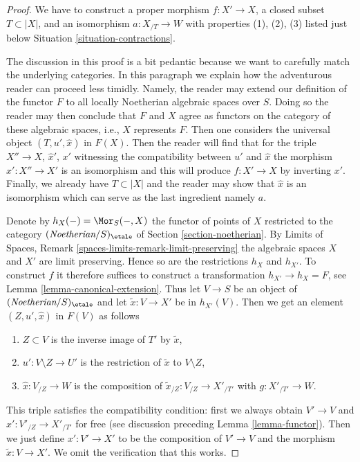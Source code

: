\begin{proof}
We have to construct a proper morphism $f : X' \to X$, a closed subset
$T \subset |X|$, and an isomorphism $a : X_{/T} \to W$ with properties
(1), (2), (3) listed just below Situation \ref{situation-contractions}.

\medskip\noindent
The discussion in this proof is a bit pedantic because we want
to carefully match the underlying categories. In this paragraph
we explain how the adventurous reader can proceed less timidly.
Namely, the reader may extend our definition of the functor $F$
to all locally Noetherian algebraic spaces over $S$.
Doing so the reader may then conclude that $F$ and $X$ agree as
functors on the category of these algebraic spaces, i.e.,
$X$ represents $F$. Then one considers the universal object
$(T, u', \hat x)$ in $F(X)$. Then the reader will find that
for the triple $X'' \to X$, $\hat x'$, $x'$ witnessing the compatibility
between $u'$ and $\hat x$ the morphism $x' : X'' \to X'$ is an isomorphism
and this will produce $f : X' \to X$ by inverting $x'$. Finally, we already
have $T \subset |X|$ and the reader may show that $\hat x$ is an isomorphism
which can serve as the last ingredient namely $a$.

\medskip\noindent
Denote by $h_X(-) = \Mor_S(-, X)$ the functor of
points of $X$ restricted to the category
$(\textit{Noetherian}/S)_\etale$ of Section \ref{section-noetherian}.
By Limits of Spaces, Remark \ref{spaces-limits-remark-limit-preserving}
the algebraic spaces $X$ and $X'$ are limit preserving. Hence so
are the restrictions $h_X$ and $h_{X'}$.
To construct $f$ it therefore suffices to construct a
transformation $h_{X'} \to h_X = F$, see Lemma \ref{lemma-canonical-extension}.
Thus let $V \to S$ be an object of $(\textit{Noetherian}/S)_\etale$
and let $\tilde x : V \to X'$ be in $h_{X'}(V)$.
Then we get an element $(Z, u', \hat x)$ in $F(V)$ as follows
\begin{enumerate}
\item $Z \subset V$ is the inverse image of $T'$ by $\tilde x$,
\item $u' : V \setminus Z \to U'$ is the restriction of
$\tilde x$ to $V \setminus Z$,
\item $\hat x : V_{/Z} \to W$ is the composition of
$\tilde x_{/Z} : V_{/Z} \to X'_{/T'}$ with $g : X'_{/T'} \to W$.
\end{enumerate}
This triple satisfies the compatibility condition: first we always
obtain $V' \to V$ and $\hat x' : V'_{/Z} \to X'_{/T'}$ for free
(see discussion preceding Lemma \ref{lemma-functor}).
Then we just define $x' : V' \to X'$ to be the composition
of $V' \to V$ and the morphism $\tilde x : V \to X'$.
We omit the verification that this works.


\end{proof}
